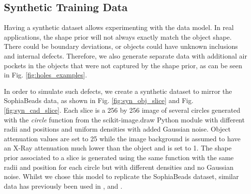 \documentclass[../main.tex]{subfiles}
\begin{document}
\subsection{Synthetic Training Data}
\label{synthetic_training_data}

Having a synthetic dataset allows experimenting with the data model. In real applications, the shape prior will not always exactly match the object shape. There could be boundary deviations, or objects could have unknown inclusions and internal defects. Therefore, we also generate separate data with additional air pockets in the objects that were not captured by the shape prior, as can be seen in Fig. \ref{fig:holes_examples}. 

In order to simulate such defects, we create a synthetic dataset to mirror the SophiaBeads data, as shown in Fig. \ref{fig:syn_obj_slice} and Fig. \ref{fig:syn_cad_slice}. Each slice is a 256 by 256 image of several circles generated with the \textit{circle} function from the scikit-image.draw Python module with different radii and positions and uniform densities with added Gaussian noise. Object attenuation values are set to 25 while the image background is assumed to have an X-Ray attenuation much lower than the object and is set to 1. The shape prior associated to a slice is generated using the same function with the same radii and position for each circle but with different densities and no Gaussian noise. Whilst we chose this model to replicate the SophiaBeads dataset, similar data has previously been used in \cite{jin2017deep}, \cite{adler2017solving} and \cite{kelly2017deep}.
\end{document}
